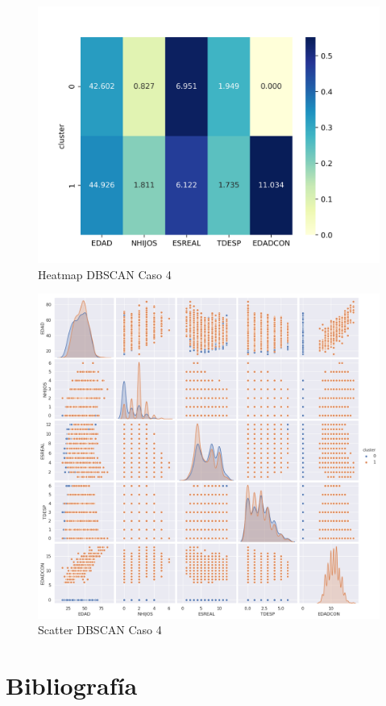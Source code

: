 \begin{figure}[H] %
	\centering
	\includegraphics[scale=0.65]{heatmap-dbscan4.png}  %
	\caption{Heatmap DBSCAN Caso 4} 
	\label{fig:hm-db-caso4}
\end{figure}

\begin{figure}[H] %
	\centering
	\includegraphics[scale=0.37]{dbscan4.png}  %
	\caption{Scatter DBSCAN Caso 4} 
	\label{fig:sc-db-caso4}
\end{figure}

\newpage
\section{Bibliografía}





